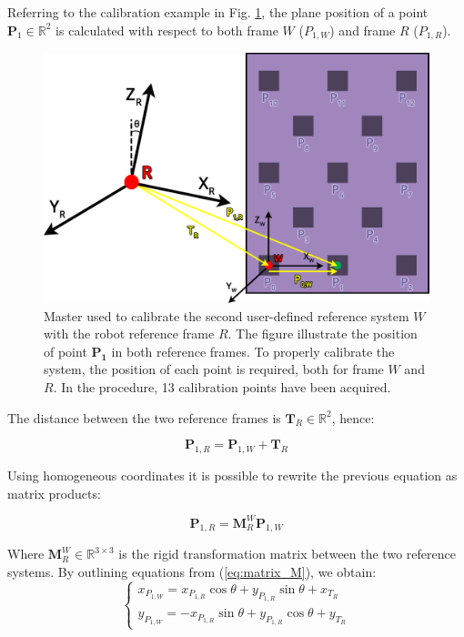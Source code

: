 \documentclass[a4paper, 10 pt, conference]{ieeeconf}      %
\begin{document}
Referring to the calibration example in Fig. \ref{fig:master_robot}, the plane position of a point $\mathbf{P}_1\in\mathbb{R}^2$ is calculated with respect to both frame $W$ ($P_{1,W}$) and frame $R$ ($P_{1,R}$).

\begin{figure}[h]
	\centering
	\includegraphics[width=1\columnwidth]{figures/calibration}
	\caption{Master used to calibrate the second user-defined reference system $W$ with the robot reference frame $R$. The figure illustrate the position of point $\mathbf{P_1}$ in both reference frames. To properly calibrate the system, the position of each point is required, both for frame $W$ and $R$. In the procedure, 13 calibration points have been acquired.}
	\label{fig:master_robot}
\end{figure}

The distance between the two reference frames is $\mathbf{T}_R\in\mathbb{R}^2$, hence:

\begin{equation}
\mathbf{P}_{1,R} = \mathbf{P}_{1,W} + \mathbf{T}_R
\end{equation}

Using homogeneous coordinates it is possible to rewrite the previous equation as matrix products:

\begin{equation}\label{eq:matrix_M}
\mathbf{P}_{1,R} = \mathbf{M}^W_{R}\mathbf{P}_{1,W}
\end{equation}

Where $\mathbf{M}^W_{R}\in\mathbb{R}^{3\times3}$ is the rigid transformation matrix between the two reference systems. By outlining equations from (\ref{eq:matrix_M}), we obtain:
\begin{equation}\label{eq:linear_sys1}
\begin{cases}
x_{P_{1,W}}=x_{P_{1,R}}\cos\theta+y_{P_{1,R}}\sin\theta+x_{T_R}\\
y_{P_{1,W}}=-x_{P_{1,R}}\sin\theta+y_{P_{1,R}}\cos\theta+y_{T_R}
\end{cases}
\end{equation}
\end{document}
